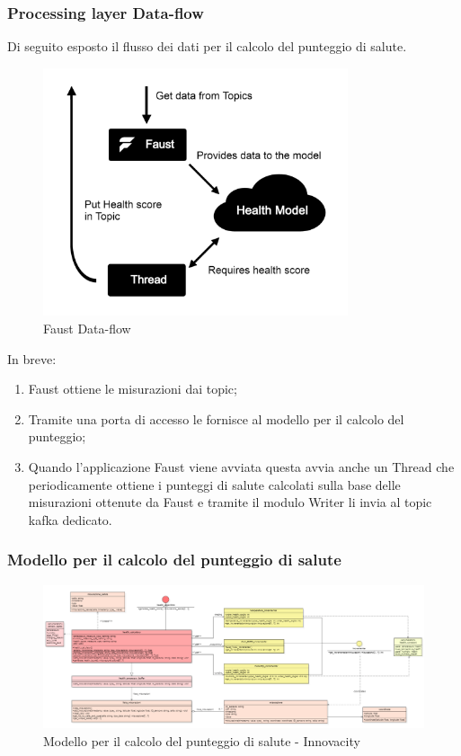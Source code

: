 \subsubsection{Processing layer Data-flow}
Di seguito esposto il flusso dei dati per il calcolo del punteggio di salute.

\begin{figure}[H]
    \centering
    \includegraphics[width=0.8\textwidth]{../Images/SpecificaTecnica/faustFlow.png}
    \caption{Faust Data-flow}
    \label{fig: FaustDataflow}
\end{figure}
In breve:
\begin{enumerate}
    \item Faust ottiene le misurazioni dai topic;
    \item Tramite una porta di accesso le fornisce al modello per il calcolo del punteggio;
    \item Quando l'applicazione Faust viene avviata questa avvia anche un Thread che periodicamente ottiene i punteggi di salute calcolati sulla base delle misurazioni ottenute da Faust e tramite il modulo Writer li invia al topic kafka dedicato.
\end{enumerate}
\subsubsection{Modello per il calcolo del punteggio di salute}
\begin{figure}[H]
    \centering
    \includegraphics[width=1.1\textwidth]{../Images/SpecificaTecnica/healthModel.PNG}
    \caption{Modello per il calcolo del punteggio di salute - Innovacity}
    \label{fig: healthModello}
\end{figure}

